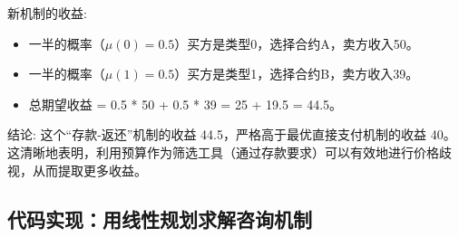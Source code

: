 新机制的收益:
\begin{itemize}
    \item 一半的概率（$\mu(0)=0.5$）买方是类型0，选择合约A，卖方收入50。
    \item 一半的概率（$\mu(1)=0.5$）买方是类型1，选择合约B，卖方收入39。
    \item 总期望收益 = 0.5 * 50 + 0.5 * 39 = 25 + 19.5 = 44.5。
\end{itemize}

结论: 这个“存款-返还”机制的收益 44.5，严格高于最优直接支付机制的收益 40。这清晰地表明，利用预算作为筛选工具（通过存款要求）可以有效地进行价格歧视，从而提取更多收益。

\subsection{代码实现：用线性规划求解咨询机制}
